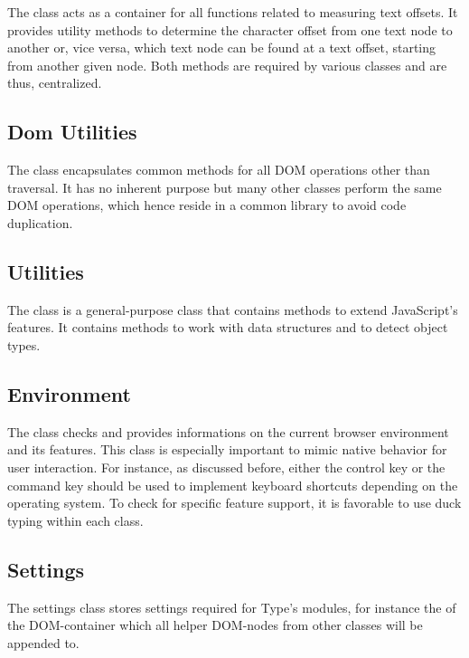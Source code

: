 The  class acts as a container for all functions related to measuring text offsets. It provides utility methods to determine the character offset from one text node to another or, vice versa, which text node can be found at a text offset, starting from another given node. Both methods are required by various classes and are thus, centralized. 

\subsection{Dom Utilities}

The  class encapsulates common methods for all DOM operations other than traversal. It has no inherent purpose but many other classes perform the same DOM operations, which hence reside in a common library to avoid code duplication.

\subsection{Utilities}
\label{sec:utilities_class}
The  class is a general-purpose class that contains methods to extend JavaScript's features. It contains methods to work with data structures and to detect object types.

\subsection{Environment}

The  class checks and provides informations on the current browser environment and its features. This class is especially important to mimic native behavior for user interaction. For instance, as discussed before, either the control key or the command key should be used to implement keyboard shortcuts depending on the operating system. To check for specific feature support, it is favorable to use duck typing within each class.

\subsection{Settings}

The settings class stores settings required for Type's modules, for instance the  of the DOM-container which all helper DOM-nodes from other classes will be appended to.

